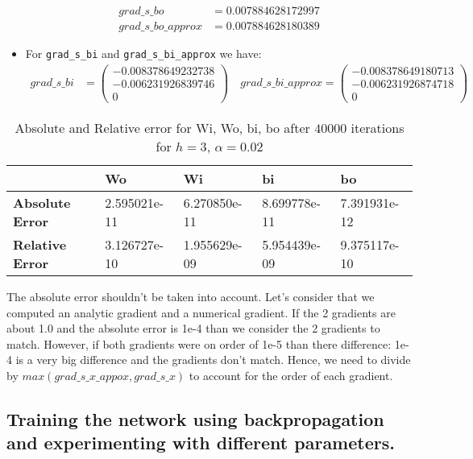 \documentclass{article}
\begin{document}
\begin{itemize}
	\begin{align*}
	grad\_s\_bo &= 0.007884628172997	\\
	grad\_s\_bo\_approx &= 0.007884628180389
	\end{align*}

\item For \texttt{grad\_s\_bi} and \texttt{grad\_s\_bi\_approx} we have:
	\begin{align*}
	grad\_s\_bi &=
	\begin{pmatrix} 
	-0.008378649232738 \\
	-0.006231926839746 \\
	0
	\end{pmatrix}
	\quad
	grad\_s\_bi\_approx =
	\begin{pmatrix} 
	-0.008378649180713 \\
	-0.006231926874718 \\
	0
	\end{pmatrix}
	\end{align*}

\end{itemize}

\begin{table}[H]
\centering
\begin{tabular}{|l|l|l|l|l|}
\hline
 & \textbf{Wo} & \textbf{Wi} & \textbf{bi} & \textbf{bo} \\ \hline
\textbf{Absolute Error} & 2.595021e-11 & 6.270850e-11 & 8.699778e-11 & 7.391931e-12 \\ \hline
\textbf{Relative Error} & 3.126727e-10 & 1.955629e-09 & 5.954439e-09 & 9.375117e-10 \\ \hline
\end{tabular}
\caption{Absolute and Relative error for Wi, Wo, bi, bo after $40000$ iterations for $h=3$, $\alpha = 0.02$}
\label{table: comparison}
\end{table}

\noindent The absolute error shouldn't be taken into account. Let's consider that we computed an analytic gradient and a numerical gradient. If the 2 gradients are about 1.0 and the absolute error is 1e-4 than we consider the 2 gradients to match. However, if both gradients were on order of 1e-5 than there difference: 1e-4 is a very big difference and the gradients don't match. Hence, we need to divide by $max(grad\_s\_x\_appox, grad\_s\_x)$ to account for the order of each gradient.

\subsection{Training the network using backpropagation and experimenting with different parameters.}
\end{document}
